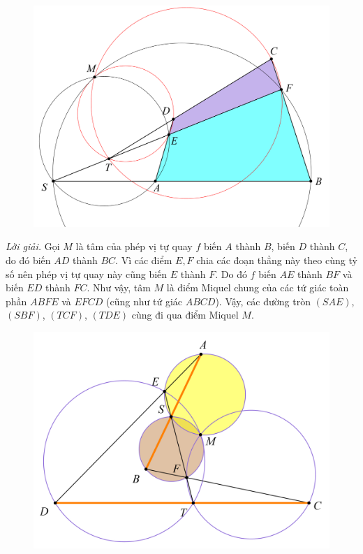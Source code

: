 \begin{multicols}{2}
	\begin{figure}[H]
		\vspace*{-5pt}
		\centering
		\captionsetup{labelformat= empty, justification=centering}
		\includegraphics[width= 1\linewidth]{18}
		\vspace*{-10pt}
	\end{figure}
	\textit{Lời giải.} Gọi $M$ là tâm của phép vị tự quay $f$ biến $A$ thành $B$, biến $D$ thành $C$, do đó biến $AD$ thành $BC$. Vì các điểm $E,F$ chia các đoạn thẳng này theo cùng tỷ số nên phép vị tự quay này cũng biến $E$ thành $F$. Do đó $f$ biến $AE$ thành $BF$ và biến $ED$ thành $FC$. Như vậy, tâm $M$ là điểm Miquel chung của các tứ giác toàn phần $ABFE$ và $EFCD$ (cũng như tứ giác $ABCD$). Vậy, các đường tròn $(SAE)$, $(SBF)$, $(TCF)$, $(TDE)$ cùng đi qua điểm Miquel $M$.
	\begin{figure}[H]
		\centering
		\captionsetup{labelformat= empty, justification=centering}
		\includegraphics[width= 1\linewidth]{19}

\end{figure}
\end{multicols}
